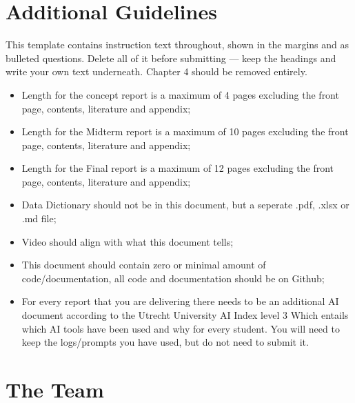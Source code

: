 \documentclass[a4paper,10pt]{article}
\begin{document}
\section{Additional Guidelines}
This template contains instruction text throughout, shown in the margins and as bulleted questions. Delete all of it before submitting — keep the headings and write your own text underneath. Chapter 4 should be removed entirely.
\begin{itemize}
    \item Length for the concept report is a maximum of 4 pages excluding the front page, contents, literature and appendix;
    \item Length for the Midterm report is a maximum of 10 pages excluding the front page, contents, literature and appendix;
    \item Length for the Final report is a maximum of 12 pages excluding the front page, contents, literature and appendix;
    \item Data Dictionary should not be in this document, but a seperate .pdf, .xlsx or .md file;
    \item Video should align with what this document tells;
    \item This document should contain zero or minimal amount of code/documentation, all code and documentation should be on Github;
    \item For every report that you are delivering there needs to be an additional AI document according to the Utrecht University AI Index level 3 \cite{AI_Index} Which entails which AI tools have been used and why for every student. You will need to keep the logs/prompts you have used, but do not need to submit it.
    \end{itemize}

\nocite{ProvostFawcett2015} %



\clearpage \newpage
\section{The Team} \label{sec:team}

%
%
%
%
%
%
\end{document}
